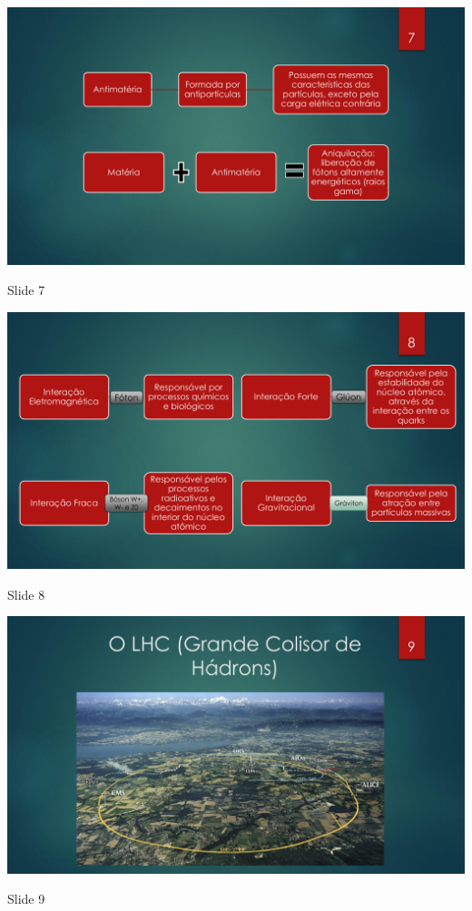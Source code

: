 \begin{figura}[ht]
	\centering
	\includegraphics[width=0.9 \textwidth]{ApeD/slide_7}
	\caption{Slide 7}
	\label{fig:app:slide_7}
\end{figura}

\begin{figura}[ht]
	\centering
	\includegraphics[width=0.9 \textwidth]{ApeD/slide_8}
	\caption{Slide 8}
	\label{fig:app:slide_8}
\end{figura}

\begin{figura}[ht]
	\centering
	\includegraphics[width=0.9 \textwidth]{ApeD/slide_9}
	\caption{Slide 9}
	\label{fig:app:slide_9}
\end{figura}

